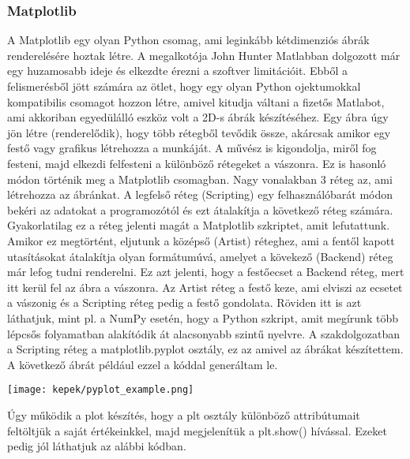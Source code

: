 \documentclass{article}
\theoremstyle{definition}
\theoremstyle{theorem}
\begin{document}
\subsubsection{Matplotlib}
A Matplotlib egy olyan Python csomag, ami leginkább kétdimenziós ábrák renderelésére hoztak létre. A megalkotója John Hunter Matlabban dolgozott már egy huzamosabb ideje és elkezdte érezni a szoftver limitációit. Ebből a felismerésből jött számára az ötlet, hogy egy olyan Python ojektumokkal kompatibilis csomagot hozzon létre, amivel kitudja váltani a fizetős Matlabot, ami akkoriban egyedülálló eszköz volt a 2D-s ábrák készítéséhez. Egy ábra úgy jön létre (renderelődik), hogy több rétegből tevődik össze, akárcsak amikor egy festő vagy grafikus létrehozza a munkáját. A művész is kigondolja, miről fog festeni, majd elkezdi felfesteni a különböző rétegeket a vászonra. Ez is hasonló módon történik meg a Matplotlib csomagban. Nagy vonalakban 3 réteg az, ami létrehozza az ábránkat. A legfelső réteg (Scripting) egy felhasználóbarát módon bekéri az adatokat a programozótól és ezt átalakítja a következő réteg számára. Gyakorlatilag ez a réteg jelenti magát a Matplotlib szkriptet, amit lefutattunk. Amikor ez megtörtént, eljutunk a középső (Artist) réteghez, ami a fentől kapott utasításokat átalakítja olyan formátumúvá, amelyet a kövekező (Backend) réteg már lefog tudni renderelni. Ez azt jelenti, hogy a festőecset a Backend réteg, mert itt kerül fel az ábra a vászonra. Az Artist réteg a festő keze, ami elviszi az ecsetet a vászonig és a Scripting réteg pedig a festő gondolata. Röviden itt is azt láthatjuk, mint pl. a NumPy esetén, hogy a Python szkript, amit megírunk több lépcsős folyamatban alakítódik át alacsonyabb szintű nyelvre.\newline
A szakdolgozatban a Scripting réteg a matplotlib.pyplot osztály, ez az amivel az ábrákat készítettem.
A következő ábrát például ezzel a kóddal generáltam le.
\begin{center}
\texttt{[image: kepek/pyplot\_example.png]}
\end{center}
Úgy működik a plot készítés, hogy a plt osztály különböző attribútumait feltöltjük a saját értékeinkkel, majd megjelenítük a plt.show() hívással. Ezeket pedig jól láthatjuk az alábbi kódban.
\pagebreak

\end{document}
